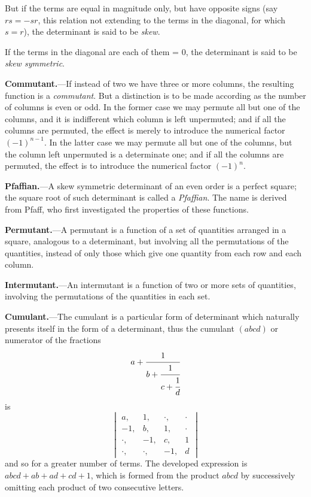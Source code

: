 \documentclass[12pt,a4paper]{article}
\theoremstyle{definition}
\begin{document}
But if the terms are equal in magnitude only, but have opposite signs (say $rs = -sr$, this relation not extending to the terms in the diagonal, for which $s = r$), the determinant is said to be \textit{skew}.

If the terms in the diagonal are each of them = 0, the determinant is said to be \textit{skew symmetric}.

\vspace{1em}

\noindent\textbf{Commutant.}---If instead of two we have three or more columns, the resulting function is a \textit{commutant}. But a distinction is to be made according as the number of columns is even or odd. In the former case we may permute all but one of the columns, and it is indifferent which column is left unpermuted; and if all the columns are permuted, the effect is merely to introduce the numerical factor $(-1)^{n-1}$. In the latter case we may permute all but one of the columns, but the column left unpermuted is a determinate one; and if all the columns are permuted, the effect is to introduce the numerical factor $(-1)^n$.

\vspace{1em}

\noindent\textbf{Pfaffian.}---A skew symmetric determinant of an even order is a perfect square; the square root of such determinant is called a \textit{Pfaffian}. The name is derived from Pfaff, who first investigated the properties of these functions.

\vspace{1em}

\noindent\textbf{Permutant.}---A permutant is a function of a set of quantities arranged in a square, analogous to a determinant, but involving all the permutations of the quantities, instead of only those which give one quantity from each row and each column.

\vspace{1em}

\noindent\textbf{Intermutant.}---An intermutant is a function of two or more sets of quantities, involving the permutations of the quantities in each set.

\vspace{1em}

\noindent\textbf{Cumulant.}---The cumulant is a particular form of determinant which naturally presents itself in the form of a determinant, thus the cumulant $(abcd)$ or numerator of the fractions
\[
a + \cfrac{1}{b + \cfrac{1}{c + \cfrac{1}{d}}}
\]
is
\[
\begin{vmatrix}
a, & 1, & \cdot, & \cdot \\
-1, & b, & 1, & \cdot \\
\cdot, & -1, & c, & 1 \\
\cdot, & \cdot, & -1, & d
\end{vmatrix}
\]
and so for a greater number of terms. The developed expression is $abcd + ab + ad + cd + 1$, which is formed from the product $abcd$ by successively omitting each product of two consecutive letters.
\end{document}
